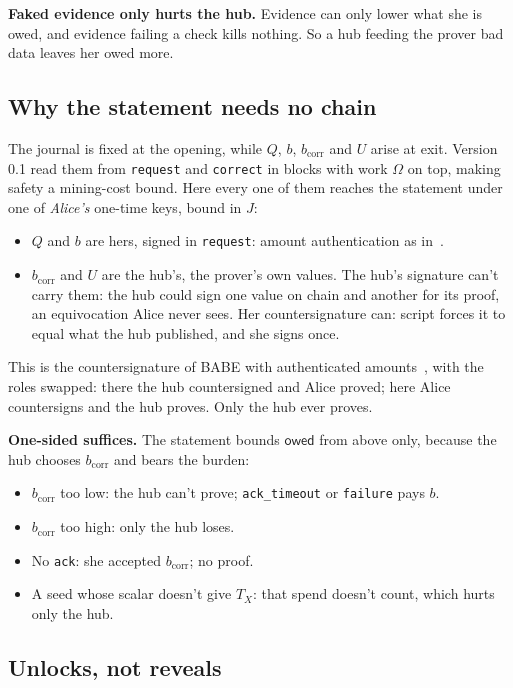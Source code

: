 \documentclass[11pt]{article}
\theoremstyle{plain}
\theoremstyle{definition}
\newcommand{\bcorr}{b_{\mathrm{corr}}}
\newcommand{\tx}[1]{\texttt{#1}}
\newcommand{\owed}{\mathsf{owed}}
\begin{document}
\textbf{Faked evidence only hurts the hub.} Evidence can only lower what
she is owed, and evidence failing a check kills nothing. So a hub
feeding the prover bad data leaves her owed more.

\subsection{Why the statement needs no chain}\label{sec:nochain}

The journal is fixed at the opening, while $Q$, $b$, $\bcorr$ and $U$
arise at exit. Version 0.1 read them from \tx{request} and \tx{correct}
in blocks with work $\Omega$ on top, making safety a mining-cost bound.
Here every one of them reaches the statement under one of \emph{Alice's}
one-time keys, bound in $J$:
\begin{itemize}[nosep]
\item $Q$ and $b$ are hers, signed in \tx{request}: amount
  authentication as in~\cite{lichen}.
\item $\bcorr$ and $U$ are the hub's, the prover's own values. The
  hub's signature can't carry them: the hub could sign one value on
  chain and another for its proof, an equivocation Alice never sees.
  Her countersignature can: script forces it to equal what the hub
  published, and she signs once.
\end{itemize}
This is the countersignature of BABE with authenticated
amounts~\cite{lichen,delving}, with the roles swapped: there the hub
countersigned and Alice proved; here Alice countersigns and the hub
proves. Only the hub ever proves.

\textbf{One-sided suffices.} The statement bounds $\owed$ from above
only, because the hub chooses $\bcorr$ and bears the burden:
\begin{itemize}[nosep]
\item $\bcorr$ too low: the hub can't prove; \tx{ack\_timeout} or
  \tx{failure} pays $b$.
\item $\bcorr$ too high: only the hub loses.
\item No \tx{ack}: she accepted $\bcorr$; no proof.
\item A seed whose scalar doesn't give $T_X$: that spend doesn't count,
  which hurts only the hub.
\end{itemize}

\subsection{Unlocks, not reveals}\label{sec:unlocks}
\end{document}
